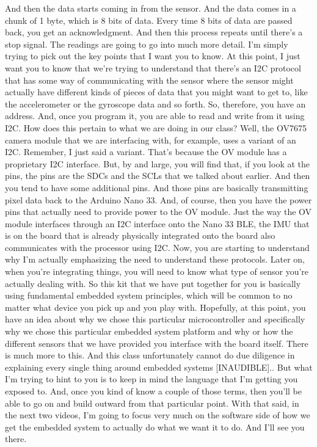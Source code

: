 And then the data starts coming in from the sensor.
And the data comes in a chunk of 1 byte, which is 8 bits of data.
Every time 8 bits of data are passed back, you get an acknowledgment.
And then this process repeats until there's a stop signal.
The readings are going to go into much more detail.
I'm simply trying to pick out the key points that I want you to know.
At this point, I just want you to know that we're trying to understand that there's an I2C protocol that has some way of communicating with the sensor where the sensor might actually have different kinds of pieces of data that you might want to get to, like the accelerometer or the gyroscope data and so forth.
So, therefore, you have an address.
And, once you program it, you are able to read and write from it using I2C.
How does this pertain to what we are doing in our class?
Well, the OV7675 camera module that we are interfacing with, for example, uses
a variant of an I2C.
Remember, I just said a variant.
That's because the OV module has a proprietary I2C interface.
But, by and large, you will find that, if you look at the pins,
the pins are the SDCs and the SCLs that we talked about earlier.
And then you tend to have some additional pins.
And those pins are basically transmitting pixel data back to the Arduino Nano 33.
And, of course, then you have the power pins that actually need to provide power to the OV module.
Just the way the OV module interfaces through an I2C interface onto the Nano 33 BLE, the IMU that is on the board that is already physically integrated onto the board also communicates with the processor using I2C.
Now, you are starting to understand why I'm actually emphasizing the need to understand these protocols.
Later on, when you're integrating things, you will need to know what type of sensor you're actually dealing with.
So this kit that we have put together for you is basically using fundamental embedded system principles, which will be common to no matter what device you pick up and you play with.
Hopefully, at this point, you have an idea about why we chose this particular microcontroller and specifically why we chose this particular embedded system platform and why or how the different sensors that we have provided you interface with the board itself.
There is much more to this.
And this class unfortunately cannot do due diligence in explaining every single thing around embedded systems [INAUDIBLE]..
But what I'm trying to hint to you is to keep in mind the language that I'm getting you exposed to.
And, once you kind of know a couple of those terms, then you'll be able to go on and build outward from that particular point.
With that said, in the next two videos, I'm going to focus very much on the software side of how we get the embedded system to actually do what we want it to do.
And I'll see you there.

